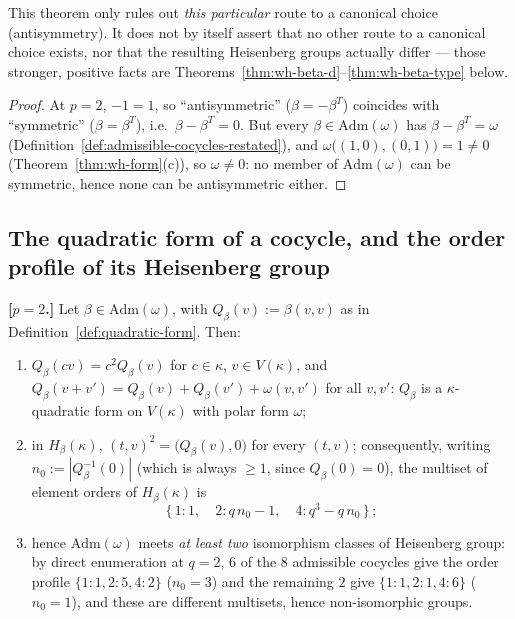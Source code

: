\begin{scope}
This theorem only rules out \emph{this particular} route to a canonical
choice (antisymmetry). It does not by itself assert that no other route to a
canonical choice exists, nor that the resulting Heisenberg groups actually
differ — those stronger, positive facts are
Theorems~\ref{thm:wh-beta-d}--\ref{thm:wh-beta-type} below.
\end{scope}


\begin{proof}
At $p=2$, $-1=1$, so ``antisymmetric'' ($\beta=-\beta^T$) coincides with
``symmetric'' ($\beta=\beta^T$), i.e.\ $\beta-\beta^T=0$. But every
$\beta\in\mathrm{Adm}(\omega)$ has $\beta-\beta^T=\omega$
(Definition~\ref{def:admissible-cocycles-restated}), and
$\omega\big((1,0),(0,1)\big)=1\neq 0$ (Theorem~\ref{thm:wh-form}(c)), so
$\omega\neq 0$: no member of $\mathrm{Adm}(\omega)$ can be symmetric, hence
none can be antisymmetric either.
\end{proof}

\subsection{The quadratic form of a cocycle, and the order profile of its
Heisenberg group}

\statusProvedConditional
\begin{theorem}
\label{thm:wh-beta-d}
\textbf{[$p=2$.]} Let $\beta\in\mathrm{Adm}(\omega)$, with
$Q_\beta(v):=\beta(v,v)$ as in Definition~\ref{def:quadratic-form}. Then:
\begin{enumerate}[label=(\roman*)]
\item $Q_\beta(cv)=c^2Q_\beta(v)$ for $c\in\kappa$, $v\in V(\kappa)$, and
$Q_\beta(v+v')=Q_\beta(v)+Q_\beta(v')+\omega(v,v')$ for all $v,v'$: $Q_\beta$
is a $\kappa$-quadratic form on $V(\kappa)$ with polar form $\omega$;
\item in $H_\beta(\kappa)$, $(t,v)^2 = \big(Q_\beta(v),0\big)$ for every
$(t,v)$; consequently, writing $n_0:=|Q_\beta^{-1}(0)|$ (which is always
$\geq 1$, since $Q_\beta(0)=0$), the multiset of element orders of
$H_\beta(\kappa)$ is
\[
\{\,1:1,\quad 2: q\,n_0-1,\quad 4: q^3-q\,n_0\,\}\,;
\]
\item hence $\mathrm{Adm}(\omega)$ meets \emph{at least two} isomorphism
classes of Heisenberg group: by direct enumeration at $q=2$, $6$ of the $8$
admissible cocycles give the order profile $\{1{:}1,2{:}5,4{:}2\}$ ($n_0=3$)
and the remaining $2$ give $\{1{:}1,2{:}1,4{:}6\}$ ($n_0=1$), and these are
different multisets, hence non-isomorphic groups.
\end{enumerate}
\end{theorem}

